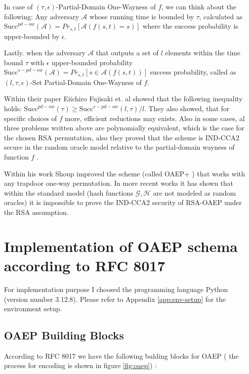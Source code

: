 \documentclass[10pt,a4paper]{article}
\begin{document}
In case of $(\tau, \epsilon)$-Partial-Domain One-Wayness of $f$, 
we can think about the following: Any adversary $\mathcal{A}$ whose running time is bounded by $\tau$, calculated as $\mathrm{Succ}^{pd-ow} (\mathcal{A}) = Pr_{s,t}  \left[ \mathcal{A}(f(s,t)=s) \right]$ where the success probability is upper-bounded by $\epsilon$.\cite{Kilian2001} 

Lastly. when the adversary $\mathcal{A}$ that outputs a set of $l$ elements within the time bound $\tau$ with $\epsilon$ upper-bounded probability $\mathrm{Succ}^{s-pd-ow}(\mathcal{A}) = Pr_{s,t} \left[  s \in \mathcal{A}(f(s,t)) \right]$ success probability, called as $(l,\tau, \epsilon)$-Set Partial-Domain One-Wayness of $f$.\cite{Kilian2001}

Within their paper Eiichiro Fujisaki et. al\cite{Kilian2001} showed that the following inequality holds: $\mathrm{Succ}^{pd-ow}(\tau) \geq \mathrm{Succ}^{s-pd-ow}(l,\tau)/l$. They also showed, that for specific choices of $f$ more, efficient reductions may exists. Also in some cases, al three problems written above are polynomially equivalent, which is the case for the chosen RSA permutation, also they proved that the scheme is IND-CCA2 secure in the random oracle model relative to the partial-domain wayness of function $f$ \cite{Bellare1993,Kilian2001, RSA78}.

Within his work Shoup improved the scheme (called OAEP+ ) that works with any trapdoor one-way permutation.  In more recent works it has shown that within the standard model (hash functions $\mathcal{G},\mathcal{H} $ are not modeled as random oracles) it is impossible to prove the IND-CCA2 security of RSA-OAEP under the RSA assumption. \cite{Shoup2001, Paillier2006, Brown2006}

\section{Implementation of OAEP schema according to RFC 8017}

For implementation purpose I choosed the programming language Python (version number 3.12.8). 
 Please refer to Appendix \ref{app:env-setup} for the environment setup.

\subsection{OAEP Building Blocks}

According to RFC 8017 we have the following bulding blocks for OAEP ( the process for encoding is shown in figure \ref{fig:oaep}) \cite{rfc8017}:
\end{document}

